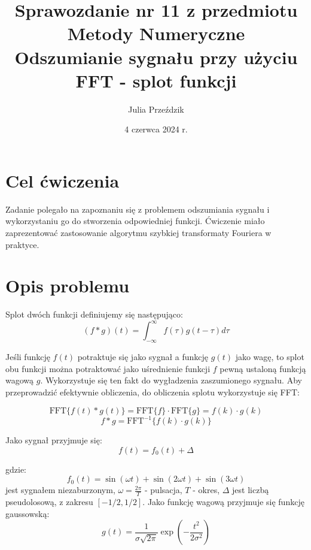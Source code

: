 \documentclass{article}
\begin{document}
\Large

\title{\LARGE Sprawozdanie nr 11 z przedmiotu Metody Numeryczne\\
       \LARGE Odszumianie sygnału przy użyciu FFT - splot funkcji}
\author{Julia Przeździk}
\date{4 czerwca 2024 r.}
\maketitle

\large

\section{Cel ćwiczenia}

Zadanie polegało na zapoznaniu się z problemem odszumiania sygnału i wykorzystaniu go do stworzenia odpowiedniej funkcji. Ćwiczenie miało zaprezentować zastosowanie algorytmu szybkiej transformaty Fouriera w praktyce. 

\section{Opis problemu}

Splot dwóch funkcji definiujemy się następująco:
\begin{equation*}
    (f * g)(t) = \int_{-\infty}^{\infty} f(\tau) g(t - \tau) d\tau
\end{equation*}

\noindent
Jeśli funkcję \(f(t)\) potraktuje się jako sygnał a funkcję \(g(t)\) jako wagę, to splot obu funkcji można potraktować jako uśrednienie funkcji \(f\) pewną ustaloną funkcją wagową \(g\). Wykorzystuje się ten fakt do wygładzenia zaszumionego sygnału. Aby przeprowadzić efektywnie obliczenia, do obliczenia splotu wykorzystuje się FFT:

\begin{equation*}
    \text{FFT}\{f(t) * g(t)\} = \text{FFT}\{f\} \cdot \text{FFT}\{g\} = f(k) \cdot g(k)
\end{equation*}
\begin{equation*}
    f * g = \text{FFT}^{-1}\{f(k) \cdot g(k)\}
\end{equation*}

\noindent
Jako sygnał przyjmuje się:
\[
f(t) = f_0(t) + \Delta
\]

\noindent
gdzie:
\begin{equation*}
    f_0(t) = \sin(\omega t) + \sin(2 \omega t) + \sin(3 \omega t)
\end{equation*}
jest sygnałem niezaburzonym, \(\omega = \frac{2\pi}{T}\) - pulsacja, \(T\) - okres, \(\Delta\) jest liczbą pseudolosową, z zakresu \([-1/2, 1/2]\). Jako funkcję wagową przyjmuje się funkcję gaussowską:
\begin{equation*}
    g(t) = \frac{1}{\sigma\sqrt{2\pi}} \exp\left(-\frac{t^2}{2\sigma^2}\right)
\end{equation*}
\end{document}
